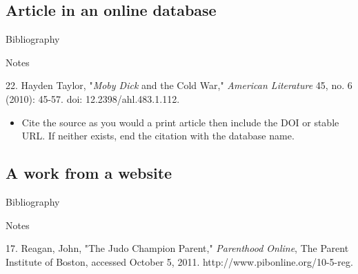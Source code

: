 \subsection{Article in an online database}
\begin{center}{Bibliography}\end{center}

\begin{singlespace}
\noindent{}
\end{singlespace}

\begin{center}{Notes}\end{center} 

\begin{singlespace}
\noindent\hspace{1.2cm}22. Hayden Taylor,
"\emph{Moby Dick} and the Cold War," \emph{American Literature} 45, no. 6
(2010): 45-57. doi: 12.2398/ahl.483.1.112.
\end{singlespace}


\begin{itemize}\item Cite the source as you would a print article then include
the DOI or stable URL. If neither exists, end the citation with the database
name.\end{itemize}

\subsection{A work from a website} \begin{center}{Bibliography}\end{center}

\begin{singlespace}
\noindent{}
\end{singlespace}

\begin{center}{Notes}\end{center} 
\begin{singlespace}
\noindent\hspace{1.2cm}17. Reagan, John, "The
Judo Champion Parent," \emph{Parenthood Online}, The Parent Institute of Boston,
accessed October 5, 2011. http://www.pibonline.org/10-5-reg.
\end{singlespace}

